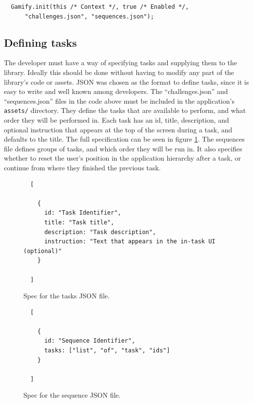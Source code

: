 \begin{verbatim}
  Gamify.init(this /* Context */, true /* Enabled */,
      "challenges.json", "sequences.json");
\end{verbatim}

\subsection{Defining tasks}

The developer must have a way of specifying tasks and supplying
them to the library. Ideally this should be done without having
to modify any part of the library's code or assets. JSON was
chosen as the format to define tasks, since it is easy to write
and well known among developers.
The ``challenges.json'' and ``sequences.json'' files in the code
above must be included in the application's \verb+assets/+ directory.
They define the tasks that are available to perform, and what order
they will be performed in.
Each task has an id, title, description, and optional instruction
that appears at the top of the screen during a task, and defaults
to the title. The full specification can be seen in figure \ref{fig:task-spec}.
The sequences file defines groups of tasks, and which
order they will be run in. It also specifies whether to reset the
user's position in the application hierarchy after a task, or
continue from where they finished the previous task.

\begin{figure}[h]
  \begin{verbatim}
  [
  
    {
      id: "Task Identifier", 
      title: "Task title",
      description: "Task description",
      instruction: "Text that appears in the in-task UI (optional)"
    }
    
  ]
  \end{verbatim}
  \label{fig:task-spec}
  \caption{Spec for the tasks JSON file.}
\end{figure}

\begin{figure}[h]
  \begin{verbatim}
  [
  
    {
      id: "Sequence Identifier", 
      tasks: ["list", "of", "task", "ids"]
    }
    
  ]
  \end{verbatim}
  \label{fig:sequence-spec}
  \caption{Spec for the sequence JSON file.}
\end{figure}

